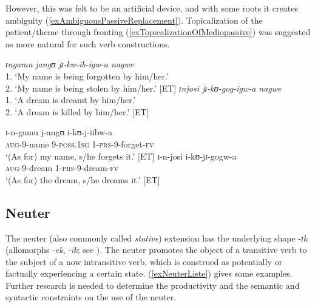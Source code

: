 However, this was felt to be an artificial device, and with some roots it creates ambiguity (\ref{exAmbiguousPassiveReplacement}). Topicalization of the patient/theme through fronting (\ref{exTopicalizationOfMediopassive}) was suggested as more natural for such verb constructions.
\begin{exe}
\ex \label{exAmbiguousPassiveReplacement}\begin{xlist}
\ex \textit{ɪngamu jangʊ jɪ-kw-ib-igw-a nagwe}\\
1. \lq My name is being forgotten by him/her.'\\
2. \lq My name is being stolen by him/her.' [ET]
\ex \textit{ɪnjosi jɪ-kʊ-gog-igw-a nagwe}\\
1. \lq A dream is dreamt by him/her.'\\
2. \lq A dream is killed by him/her.' [ET]
\end{xlist}
\ex \label{exTopicalizationOfMediopassive}
\begin{xlist}
\ex \gll ɪ-n-gamu j-angʊ i-kʊ-j-iibw-a\\
\textsc{aug}-9-name 9-\textsc{poss.1sg} 1-\textsc{prs}-9-forget-\textsc{fv}\\
\glt `(As for) my name, s/he forgets it.' [ET]
\ex \gll ɪ-n-josi i-kʊ-jɪ-gogw-a\\
\textsc{aug}-9-dream 1-\textsc{prs}-9-dream-\textsc{fv}\\
\glt `(As for) the dream, s/he dreams it.' [ET]
\end{xlist}
\end{exe}

\subsection{Neuter}\label{Neuter}
The neuter (also commonly called \textit{stative}) extension has the underlying shape -\textit{ɪk} (allomorphs -\textit{ek}, -\textit{ik}; see ). The neuter promotes the object of a transitive verb to the subject of a now intransitive verb, which is construed as potentially or factually experiencing a certain state. (\ref{exNeuterListe}) gives some examples. Further research is needed to determine the productivity and the semantic and syntactic constraints on the use of the neuter.

